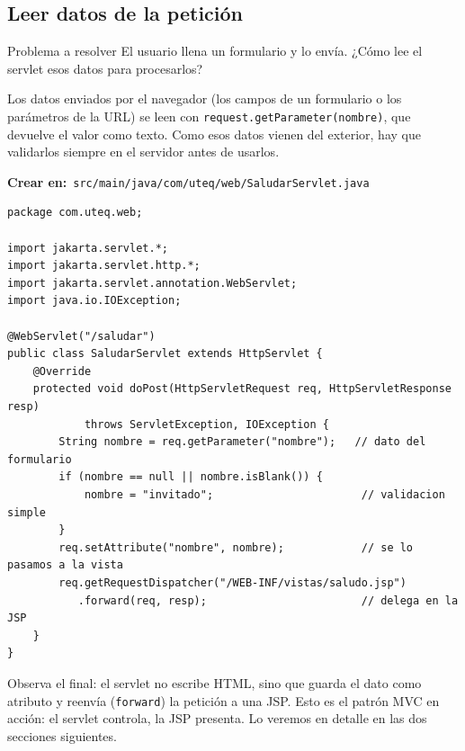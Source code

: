 \documentclass[11pt]{article}
\begin{document}
\subsection{Leer datos de la petición}
\begin{cajaproblema}{Problema a resolver}
El usuario llena un formulario y lo envía. ¿Cómo lee el servlet esos datos para procesarlos?\par
\end{cajaproblema}
Los datos enviados por el navegador (los campos de un formulario o los parámetros de la URL) se leen con \texttt{request.\allowbreak{}get\allowbreak{}Parameter(nombre)}, que devuelve el valor como texto. Como esos datos vienen del exterior, hay que validarlos siempre en el servidor antes de usarlos.

{\small\color{jwebazulo}\textbf{Crear en:}~}\texttt{src/\allowbreak{}main/\allowbreak{}java/\allowbreak{}com/\allowbreak{}uteq/\allowbreak{}web/\allowbreak{}Saludar\allowbreak{}Servlet.\allowbreak{}java}\par\nobreak\vspace{-1pt}
\begin{cajacodigo}
\begin{lstlisting}[style=java]
package com.uteq.web;

import jakarta.servlet.*;
import jakarta.servlet.http.*;
import jakarta.servlet.annotation.WebServlet;
import java.io.IOException;

@WebServlet("/saludar")
public class SaludarServlet extends HttpServlet {
    @Override
    protected void doPost(HttpServletRequest req, HttpServletResponse resp)
            throws ServletException, IOException {
        String nombre = req.getParameter("nombre");   // dato del formulario
        if (nombre == null || nombre.isBlank()) {
            nombre = "invitado";                       // validacion simple
        }
        req.setAttribute("nombre", nombre);            // se lo pasamos a la vista
        req.getRequestDispatcher("/WEB-INF/vistas/saludo.jsp")
           .forward(req, resp);                        // delega en la JSP
    }
}
\end{lstlisting}
\end{cajacodigo}
\vspace{2pt}
Observa el final: el servlet no escribe HTML, sino que guarda el dato como atributo y reenvía (\texttt{forward}) la petición a una JSP. Esto es el patrón MVC en acción: el servlet controla, la JSP presenta. Lo veremos en detalle en las dos secciones siguientes.
\end{document}
